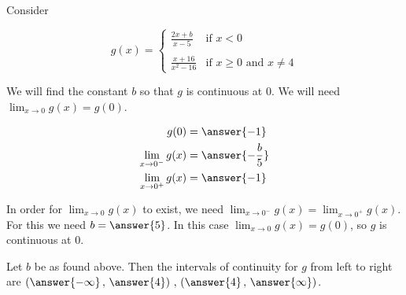 \documentclass{ximera}
\author{Nela Lakos \and Kyle Parsons}
\begin{document}
\begin{exercise}

Consider

\[
g(x) = 
\begin{cases}
\frac{2x+b}{x-5} & \text{if }x<0\\ \\
\frac{x+16}{x^2-16} & \text{if }x\geq0\text{ and }x\neq4
\end{cases}
\]

We will find the constant $b$ so that $g$ is continuous at 0.  We will need $\lim_{x\to0}g(x) = g(0)$.  

\begin{align*}
g(0) &= \answer{-1}\\
\lim_{x\to0^-}g(x) &= \answer{-\frac{b}{5}}\\
\lim_{x\to0^+} g(x)&= \answer{-1}
\end{align*}

\begin{exercise}

In order for $\lim_{x\to0}g(x)$ to exist, we need $\lim_{x\to0^-}g(x) = \lim_{x\to0^+}g(x)$. For this we need $b = \answer{5}$.  In this case $\lim_{x\to0}g(x) = g(0)$, so $g$ is continuous at 0.

\begin{exercise}

Let $b$ be as found above.  Then the intervals of continuity for $g$ from left to right are $\left(\answer{-\infty}\, , \,\answer{4}\right)\, , \,\left(\answer{4}\, ,\,\answer{\infty}\right)$.

\end{exercise}
\end{exercise}
\end{exercise}
\end{document}
